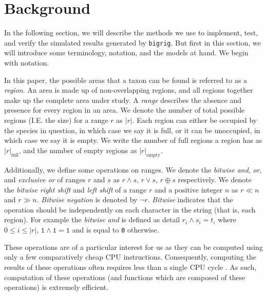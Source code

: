 \documentclass[a4paper]{article}
\newcommand{\CountFull}[1]{|#1|_\text{full}}
\newcommand{\CountEmpty}[1]{|#1|_\text{empty}}
\newcommand{\bigrig}{\texttt{bigrig}}
\newcommand{\rand}[2]{#1 \land #2}
\newcommand{\ror}[2]{#1 \lor #2}
\newcommand{\rneg}[1]{\neg #1}
\newcommand{\rxor}[2]{#1 \oplus #2}
\newcommand{\rLshift}[2]{#1 \ll #2}
\newcommand{\rRshift}[2]{#1 \gg #2}
\begin{document}
\section{Background}

In the following section, we will describe the methods we use to implement, test, and verify the simulated results
generated by \bigrig{}.
But first in this section, we will introduce some terminology, notation, and the models at hand.
We begin with notation.

In this paper, the possible areas that a taxon can be found is referred to as a \textit{region}.
An area is made up of non-overlapping regions, and all regions together make up the complete area under study.
A \textit{range} describes the absence and presence for every region in an area.
We denote the number of total possible regions (I.E. the size) for a range \( r \) as \( |r| \).
Each region can either be occupied by the species in question, in which case we say it is full, or it can be unoccupied,
in which case we say it is empty.
We write the number of full regions a region has as \( \CountFull{r} \), and the number of empty regions as \(
\CountEmpty{r} \).

Additionally, we define some operations on ranges.
We denote the \textit{bitwise} \textit{and}, \textit{or}, and \textit{exclusive or} of ranges $r$ and $s$ as
$\rand{r}{s}$, $\ror{r}{s}$, $\rxor{r}{s}$ respectively.
We denote the \textit{bitwise} \textit{right shift} and \textit{left shift} of a range $r$ and a positive integer $n$ as
$\rLshift{r}{n}$ and $\rRshift{r}{n}$\footnotemark.
\textit{Bitwise negation} is denoted by $\rneg{r}$.
\textit{Bitwise} indicates that the operation should be independently on each character in the string (that is, each
region). 
For example the \textit{bitwise and} is defined as detail $r_i \land s_i = t_i$ where $0 \leq i \leq |r|$, $\texttt{1}
\land \texttt{1} = \texttt{1}$ and is equal to \texttt{0} otherwise.


These operations are of a particular interest for us as they can be computed using only a few comparatively cheap CPU
instructions.
Consequently, computing the results of these operations often requires less than a single CPU cycle
\cite{Abel19a} \footnotemark.
As such, computation of these operations (and functions which are composed of these operations) is extremely efficient.

\end{document}
